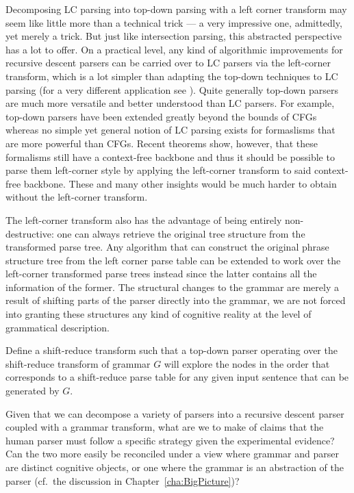 Decomposing LC parsing into top-down parsing with a left corner transform may seem like little more than a technical trick --- a very impressive one, admittedly, yet merely a trick.
But just like intersection parsing, this abstracted perspective has a lot to offer.
On a practical level, any kind of algorithmic improvements for recursive descent parsers can be carried over to LC parsers via the left-corner transform, which is a lot simpler than adapting the top-down techniques to LC parsing (for a very different application see \citealt{Johnson96}).
Quite generally top-down parsers are much more versatile and better understood than LC parsers.
For example, top-down parsers have been extended greatly beyond the bounds of CFGs whereas no simple yet general notion of LC parsing exists for formaslisms that are more powerful than CFGs.
Recent theorems show, however, that these formalisms still have a context-free backbone and thus it should be possible to parse them left-corner style by applying the left-corner transform to said context-free backbone.
These and many other insights would be much harder to obtain without the left-corner transform.

The left-corner transform also has the advantage of being entirely non-destructive: one can always retrieve the original tree structure from the transformed parse tree.
Any algorithm that can construct the original phrase structure tree from the left corner parse table can be extended to work over the left-corner transformed parse trees instead since the latter contains all the information of the former.
The structural changes to the grammar are merely a result of shifting parts of the parser directly into the grammar, we are not forced into granting these structures any kind of cognitive reality at the level of grammatical description.

\begin{exercise}
    Define a shift-reduce transform such that a top-down parser operating over the shift-reduce transform of grammar $G$ will explore the nodes in the order that corresponds to a shift-reduce parse table for any given input sentence that can be generated by $G$.
\end{exercise}
%
\begin{exercise}
    Given that we can decompose a variety of parsers into a recursive descent parser coupled with a grammar transform, what are we to make of claims that the human parser must follow a specific strategy given the experimental evidence?
    Can the two more easily be reconciled under a view where grammar and parser are distinct cognitive objects, or one where the grammar is an abstraction of the parser (cf.\ the discussion in Chapter~\ref{cha:BigPicture})?
\end{exercise}


